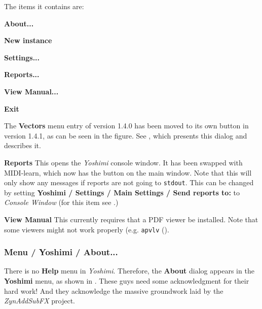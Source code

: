    The items it contains are:

   \begin{enumber}
      \item \textbf{About...}
      \item \textbf{New instance}
      \item \textbf{Settings...}
      \item \textbf{Reports...}
      \item \textbf{View Manual...}
      \item \textbf{Exit}
   \end{enumber}

   The \textbf{Vectors} menu entry of version 1.4.0 has been moved to its own
   button in version 1.4.1, as can be seen in the figure.  See
   , which presents this dialog and
   describes it.

   \textbf{Reports} This opens the \textsl{Yoshimi} console window.
   It has been swapped with MIDI-learn, which now has the button on the main window.
   Note that this will only show any messages if reports are not going to
   \texttt{stdout}. This can be changed by setting \textbf{Yoshimi / Settings
   / Main Settings / Send reports to:} to \textsl{Console Window}
   (for this item see
   .)

%

   \textbf{View Manual} This currently requires that a PDF viewer
   be installed.
   Note that some viewers might not work properly
   (e.g. \texttt{apvlv} (\cite{apvlv}).

\subsubsection{Menu / Yoshimi / About...}
\label{subsubsec:menu_yoshimi_about}

   There is no \textbf{Help} menu in \textsl{Yoshimi}.  Therefore, the
   \textbf{About} dialog appears in the \textbf{Yoshimi} menu, as shown in
   .
   These guys need some acknowledgment for their hard work!
   And they acknowledge the massive groundwork laid by the
   \textsl{ZynAddSubFX} project.

